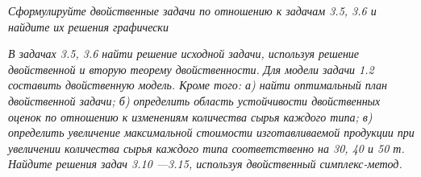 \begin{minipage}{0.4\textwidth}
\end{minipage}
\hfill
\begin{minipage}{0.4\textwidth}
\end{minipage}

\vspace{6pt}
\textit{Сформулируйте двойственные задачи по отношению к задачам 3.5, 3.6 и найдите их решения графически}
\vspace{6pt}

\begin{minipage}{0.4\textwidth}
\end{minipage}
\begin{minipage}{0.4\textwidth}
\end{minipage}

\vspace{6pt}
\addtocounter{task_counter}{1}
\textit{В задачах 3.5, 3.6 найти решение исходной задачи, используя решение двойственной и вторую теорему двойственности.}
\vspace{6pt}
\zadanie{}
\textit{Для модели задачи 1.2 составить двойственную модель. Кроме того: а) найти оптимальный план двойственной задачи; б) определить область устойчивости двойственных оценок по отношению к изменениям количества сырья каждого типа; в) определить увеличение максимальной стоимости изготавливаемой продукции при увеличении количества сырья каждого типа соответственно на 30, 40 и 50 т.}
\vspace{6pt}
\textit{Найдите решения задач 3.10 —3.15, используя двойственный симплекс-метод.}
\vspace{6pt}


